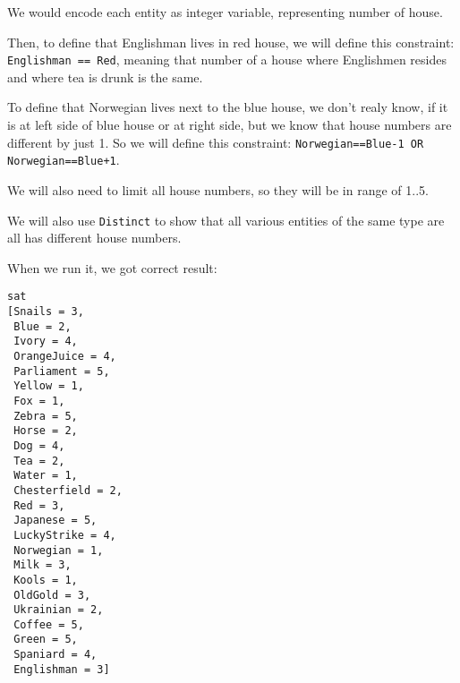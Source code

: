 We would encode each entity as integer variable, representing number of house.

Then, to define that Englishman lives in red house, we will define this constraint: \texttt{Englishman == Red}, meaning that number of a house where Englishmen resides and where tea is drunk is the same.

To define that Norwegian lives next to the blue house, we don't realy know, if it is at left side of blue house or at right side, but we know that house numbers are different by just 1.
So we will define this constraint: \texttt{Norwegian==Blue-1 OR Norwegian==Blue+1}.

We will also need to limit all house numbers, so they will be in range of 1..5.

We will also use \texttt{Distinct} to show that all various entities of the same type are all has different house numbers.



When we run it, we got correct result:

\begin{lstlisting}
sat
[Snails = 3,
 Blue = 2,
 Ivory = 4,
 OrangeJuice = 4,
 Parliament = 5,
 Yellow = 1,
 Fox = 1,
 Zebra = 5,
 Horse = 2,
 Dog = 4,
 Tea = 2,
 Water = 1,
 Chesterfield = 2,
 Red = 3,
 Japanese = 5,
 LuckyStrike = 4,
 Norwegian = 1,
 Milk = 3,
 Kools = 1,
 OldGold = 3,
 Ukrainian = 2,
 Coffee = 5,
 Green = 5,
 Spaniard = 4,
 Englishman = 3]
 \end{lstlisting}

